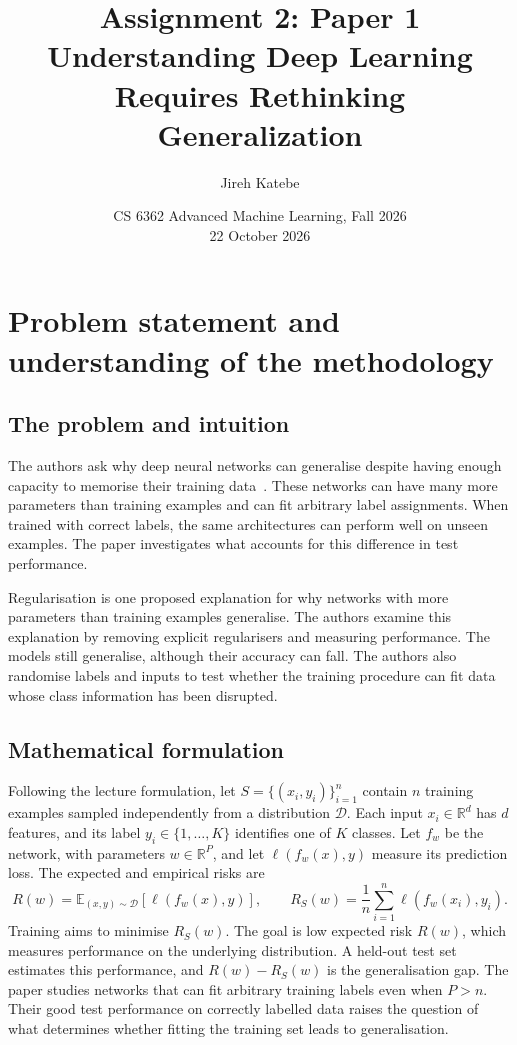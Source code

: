 \documentclass[11pt]{article}
\title{Assignment 2: Paper 1\\[0.4em]
\large Understanding Deep Learning Requires Rethinking Generalization}
\author{Jireh Katebe}
\date{CS 6362 Advanced Machine Learning, Fall 2026\\22 October 2026}
\begin{document}
\maketitle

\section{Problem statement and understanding of the methodology}

\subsection{The problem and intuition}

The authors ask why deep neural networks can generalise despite having enough capacity to memorise their training data~\cite{zhang2017}. These networks can have many more parameters than training examples and can fit arbitrary label assignments. When trained with correct labels, the same architectures can perform well on unseen examples. The paper investigates what accounts for this difference in test performance.

Regularisation is one proposed explanation for why networks with more parameters than training examples generalise. The authors examine this explanation by removing explicit regularisers and measuring performance. The models still generalise, although their accuracy can fall. The authors also randomise labels and inputs to test whether the training procedure can fit data whose class information has been disrupted.

\subsection{Mathematical formulation}

Following the lecture formulation, let $S=\{(x_i,y_i)\}_{i=1}^{n}$ contain $n$ training examples sampled independently from a distribution $\mathcal{D}$. Each input $x_i\in\mathbb{R}^{d}$ has $d$ features, and its label $y_i\in\{1,\ldots,K\}$ identifies one of $K$ classes. Let $f_w$ be the network, with parameters $w\in\mathbb{R}^{P}$, and let $\ell(f_w(x),y)$ measure its prediction loss. The expected and empirical risks are
\[
R(w)=\mathbb{E}_{(x,y)\sim\mathcal{D}}[\ell(f_w(x),y)],
\qquad
R_S(w)=\frac{1}{n}\sum_{i=1}^{n}\ell(f_w(x_i),y_i).
\]
Training aims to minimise $R_S(w)$. The goal is low expected risk $R(w)$, which measures performance on the underlying distribution. A held-out test set estimates this performance, and $R(w)-R_S(w)$ is the generalisation gap. The paper studies networks that can fit arbitrary training labels even when $P>n$. Their good test performance on correctly labelled data raises the question of what determines whether fitting the training set leads to generalisation.
\end{document}
